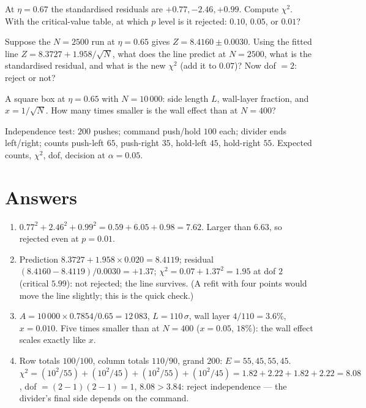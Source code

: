 \documentclass[11pt,a4paper]{article}
\begin{document}
\begin{ex}[Exercise 1]
At $\eta = 0.67$ the standardised residuals are $+0.77, -2.46, +0.99$. Compute $\chi^2$. With the critical-value table, at which $p$ level is it rejected: $0.10$, $0.05$, or $0.01$?
\end{ex}
\begin{ex}[Exercise 2]
Suppose the $N = 2500$ run at $\eta = 0.65$ gives $Z = 8.4160\pm0.0030$. Using the fitted line $Z = 8.3727 + 1.958/\sqrt N$, what does the line predict at $N = 2500$, what is the standardised residual, and what is the new $\chi^2$ (add it to $0.07$)? Now dof $= 2$: reject or not?
\end{ex}
\begin{ex}[Exercise 3]
A square box at $\eta = 0.65$ with $N = 10\,000$: side length $L$, wall-layer fraction, and $x = 1/\sqrt N$. How many times smaller is the wall effect than at $N = 400$?
\end{ex}
\begin{ex}[Exercise 4]
Independence test: $200$ pushes; command push/hold $100$ each; divider ends left/right; counts push-left $65$, push-right $35$, hold-left $45$, hold-right $55$. Expected counts, $\chi^2$, dof, decision at $\alpha = 0.05$.
\end{ex}

\section{Answers}
\label{sec:answers}
\begin{enumerate}[label=\textbf{\arabic*.},nosep,itemsep=3pt]
\item $0.77^2 + 2.46^2 + 0.99^2 = 0.59 + 6.05 + 0.98 = 7.62$. Larger than $6.63$, so rejected even at $p = 0.01$.
\item Prediction $8.3727 + 1.958\times0.020 = 8.4119$; residual $(8.4160 - 8.4119)/0.0030 = +1.37$; $\chi^2 = 0.07 + 1.37^2 = 1.95$ at dof $2$ (critical $5.99$): not rejected; the line survives. (A refit with four points would move the line slightly; this is the quick check.)
\item $A = 10\,000\times0.7854/0.65 = 12\,083$, $L = 110\,\sigma$, wall layer $4/110 = 3.6\%$, $x = 0.010$. Five times smaller than at $N = 400$ ($x = 0.05$, $18\%$): the wall effect scales exactly like $x$.
\item Row totals $100/100$, column totals $110/90$, grand $200$: $E = 55, 45, 55, 45$. $\chi^2 = (10^2/55) + (10^2/45) + (10^2/55) + (10^2/45) = 1.82 + 2.22 + 1.82 + 2.22 = 8.08$, dof $= (2-1)(2-1) = 1$, $8.08 > 3.84$: reject independence --- the divider's final side depends on the command.
\end{enumerate}
\end{document}
